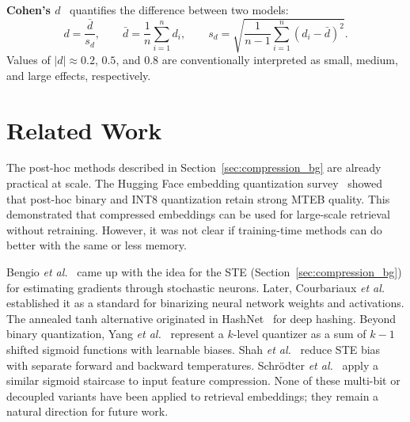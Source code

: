 \textbf{Cohen's $d$}~\cite{cohen1988statistical} quantifies the difference between two models:
%
\begin{equation}
  d = \frac{\bar{d}}{s_d}, \qquad
  \bar{d} = \frac{1}{n}\sum_{i=1}^{n} d_i, \qquad
  s_d = \sqrt{\frac{1}{n-1}\sum_{i=1}^{n}(d_i - \bar{d})^2}.
  \label{eq:cohens_d}
\end{equation}
%
Values of $|d| \approx 0.2$, $0.5$, and $0.8$ are conventionally interpreted as small, medium, and large effects, respectively.

\section{Related Work}
\label{sec:related}

The post-hoc methods described in Section~\ref{sec:compression_bg} are already practical at scale. The Hugging Face embedding quantization survey~\cite{shakir2024embedding} showed that post-hoc binary and INT8 quantization retain strong MTEB quality. This demonstrated that compressed embeddings can be used for large-scale retrieval without retraining. However, it was not clear if training-time methods can do better with the same or less memory.

Bengio \textit{et al.}~\cite{bengio2013estimating} came up with the idea for the STE (Section~\ref{sec:compression_bg}) for estimating gradients through stochastic neurons. Later, Courbariaux \textit{et al.}~\cite{courbariaux2016bnn} established it as a standard for binarizing neural network weights and activations. The annealed tanh alternative originated in HashNet~\cite{cao2017hashnet} for deep hashing. Beyond binary quantization, Yang \textit{et al.}~\cite{yang2019quantization} represent a $k$-level quantizer as a sum of $k{-}1$ shifted sigmoid functions with learnable biases. Shah \textit{et al.}~\cite{shah2024decoupled} reduce STE bias with separate forward and backward temperatures. Schr{\"o}dter \textit{et al.}~\cite{schrodter2025trainable} apply a similar sigmoid staircase to input feature compression. None of these multi-bit or decoupled variants have been applied to retrieval embeddings; they remain a natural direction for future work.

